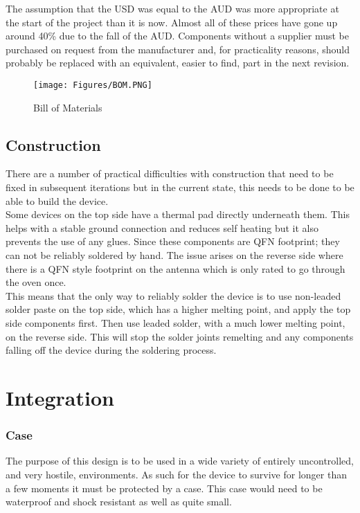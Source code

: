 \documentclass[12pt,openany,a4paper]{book}
\begin{document}
		The assumption that the USD was equal to the AUD was more appropriate at the start of the project than it is now. Almost all of these prices have gone up around 40\% due to the fall of the AUD. Components without a supplier must be purchased on request from the manufacturer and, for practicality reasons, should probably be replaced with an equivalent, easier to find, part in the next revision.
		\begin{figure}[H]
			\centering
			\texttt{[image: Figures/BOM.PNG]}
			\caption{Bill of Materials}
			\label{fig:BOM}
		\end{figure}	
		

		\subsection{Construction}
		There are a number of practical difficulties with construction that need to be fixed in subsequent iterations but in the current state, this needs to be done to be able to build the device. \\
		
		Some devices on the top side have a thermal pad directly underneath them. This helps with a stable ground connection and reduces self heating but it also prevents the use of any glues. Since these components are QFN footprint; they can not be reliably soldered by hand. The issue arises on the reverse side where there is a QFN style footprint on the antenna which is only rated to go through the oven once. \\
		
		This means that the only way to reliably solder the device is to use non-leaded solder paste on the top side, which has a higher melting point, and apply the top side components first. Then use leaded solder, with a much lower melting point, on the reverse side. This will stop the solder joints remelting and any components falling off the device during the soldering process.
		
	\section{Integration}
	\subsubsection{Case}
	The purpose of this design is to be used in a wide variety of entirely uncontrolled, and very hostile, environments. As such for the device to survive for longer than a few moments it must be protected by a case. This case would need to be waterproof and shock resistant as well as quite small. \\
	
\end{document}
